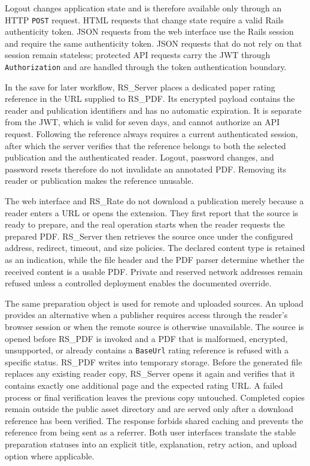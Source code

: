 \documentclass[a4paper, english]{article}
\newcommand{\rsserver}{RS\_Server\xspace}
\newcommand{\rspdf}{RS\_PDF\xspace}
\newcommand{\rsrate}{RS\_Rate\xspace}
\begin{document}
Logout changes application state and is therefore available only through an HTTP \verb|POST| request. HTML requests that change state require a valid Rails authenticity token. JSON requests from the web interface use the Rails session and require the same authenticity token. JSON requests that do not rely on that session remain stateless; protected API requests carry the JWT through \verb|Authorization| and are handled through the token authentication boundary.

In the save for later workflow, \rsserver places a dedicated paper rating reference in the URL supplied to \rspdf. Its encrypted payload contains the reader and publication identifiers and has no automatic expiration. It is separate from the JWT, which is valid for seven days, and cannot authorize an API request. Following the reference always requires a current authenticated session, after which the server verifies that the reference belongs to both the selected publication and the authenticated reader. Logout, password changes, and password resets therefore do not invalidate an annotated PDF. Removing its reader or publication makes the reference unusable.

The web interface and \rsrate do not download a publication merely because a reader enters a URL or opens the extension. They first report that the source is ready to prepare, and the real operation starts when the reader requests the prepared PDF. \rsserver then retrieves the source once under the configured address, redirect, timeout, and size policies. The declared content type is retained as an indication, while the file header and the PDF parser determine whether the received content is a usable PDF. Private and reserved network addresses remain refused unless a controlled deployment enables the documented override.

The same preparation object is used for remote and uploaded sources. An upload provides an alternative when a publisher requires access through the reader's browser session or when the remote source is otherwise unavailable. The source is opened before \rspdf is invoked and a PDF that is malformed, encrypted, unsupported, or already contains a \verb|BaseUrl| rating reference is refused with a specific status. \rspdf writes into temporary storage. Before the generated file replaces any existing reader copy, \rsserver opens it again and verifies that it contains exactly one additional page and the expected rating URL. A failed process or final verification leaves the previous copy untouched. Completed copies remain outside the public asset directory and are served only after a download reference has been verified. The response forbids shared caching and prevents the reference from being sent as a referrer. Both user interfaces translate the stable preparation statuses into an explicit title, explanation, retry action, and upload option where applicable.
\end{document}
